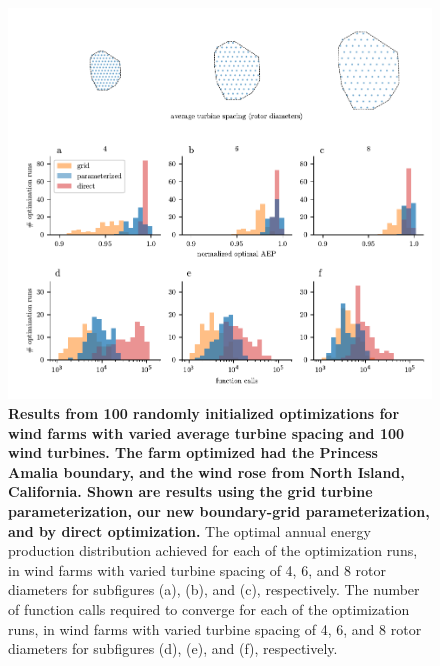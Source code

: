 \documentclass[wes, manuscript]{copernicus}
\begin{document}
\begin{figure}
\centering
\includegraphics{paper-figures/results_spacingR1.pdf}
\caption{\textbf{Results from 100 randomly initialized optimizations for wind farms with varied average turbine spacing and 100 wind turbines. The farm optimized had the Princess Amalia boundary, and the wind rose from North Island, California. Shown are results using the grid turbine parameterization, our new boundary-grid parameterization, and by direct optimization.} The optimal annual energy production distribution achieved for each of the optimization runs, in wind farms with varied turbine spacing of 4, 6, and 8 rotor diameters for subfigures (a), (b), and (c), respectively. The number of function calls required to converge for each of the optimization runs, in wind farms with varied turbine spacing of 4, 6, and 8 rotor diameters for subfigures (d), (e), and (f), respectively. }
\label{results-spacing}
\end{figure}
\end{document}
